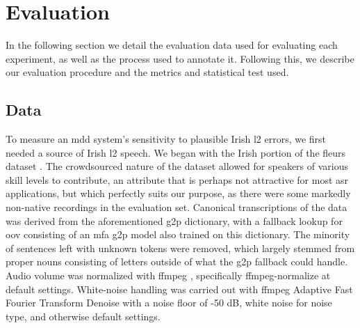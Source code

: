 \documentclass[thesis]{cluu}
\begin{document}
\section{Evaluation}\label{sec:eval}
In the following section we detail the evaluation data used for evaluating each experiment, as well as the process used to annotate it. Following this, we describe our evaluation procedure and the metrics and statistical test used.

\subsection{Data}
To  measure an \gls{mdd} system's sensitivity to plausible Irish \gls{l2} errors, we first needed a source of Irish \gls{l2} speech. We began with the Irish portion of the \gls{fleurs} dataset \parencite{conneauFLEURSFewshotLearning2022}. The crowdsourced nature of the dataset allowed for speakers of various skill levels to contribute, an attribute that is perhaps not attractive for most \gls{asr} applications, but which perfectly suits our purpose, as there were some markedly non-native recordings in the evaluation set. Canonical transcriptions of the data was derived from the aforementioned \gls{g2p} dictionary, with a fallback lookup for \gls{oov} consisting of an \gls{mfa} \gls{g2p} model also trained on this dictionary. The minority of sentences left with unknown tokens were removed, which largely stemmed from proper nouns consisting of letters outside of what the \gls{g2p} fallback could handle. Audio volume was normalized with ffmpeg \parencite{ffmpeg}, specifically ffmpeg-normalize at default settings. White-noise handling was carried out with ffmpeg Adaptive Fast Fourier Transform Denoise with a noise floor of -50 dB, white noise for noise type, and otherwise default settings.
\end{document}
